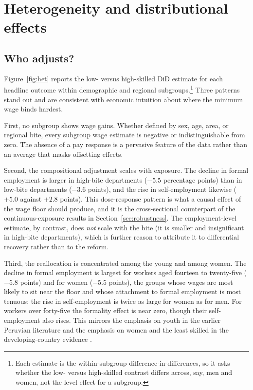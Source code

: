 \section{Heterogeneity and distributional effects}\label{sec:heterogeneity}

\subsection{Who adjusts?}

Figure~\ref{fig:het} reports the low- versus high-skilled DiD estimate for each headline outcome within demographic and regional subgroups.\footnote{Each estimate is the within-subgroup difference-in-differences, so it asks whether the low- versus high-skilled contrast differs across, say, men and women, not the level effect for a subgroup.} Three patterns stand out and are consistent with economic intuition about where the minimum wage binds hardest.

First, no subgroup shows wage gains. Whether defined by sex, age, area, or regional bite, every subgroup wage estimate is negative or indistinguishable from zero. The absence of a pay response is a pervasive feature of the data rather than an average that masks offsetting effects.

Second, the compositional adjustment scales with exposure. The decline in formal employment is larger in high-bite departments ($-5.5$ percentage points) than in low-bite departments ($-3.6$ points), and the rise in self-employment likewise ($+5.0$ against $+2.8$ points). This dose-response pattern is what a causal effect of the wage floor should produce, and it is the cross-sectional counterpart of the continuous-exposure results in Section~\ref{sec:robustness}. The employment-level estimate, by contrast, does \emph{not} scale with the bite (it is smaller and insignificant in high-bite departments), which is further reason to attribute it to differential recovery rather than to the reform.

Third, the reallocation is concentrated among the young and among women. The decline in formal employment is largest for workers aged fourteen to twenty-five ($-5.8$ points) and for women ($-5.5$ points), the groups whose wages are most likely to sit near the floor and whose attachment to formal employment is most tenuous; the rise in self-employment is twice as large for women as for men. For workers over forty-five the formality effect is near zero, though their self-employment also rises. This mirrors the emphasis on youth in the earlier Peruvian literature \citep{cespedes_2005, jaramillo_lopez_2006} and the emphasis on women and the least skilled in the developing-country evidence \citep{katzkowicz_2021_uruguay, lemos_2009}.


